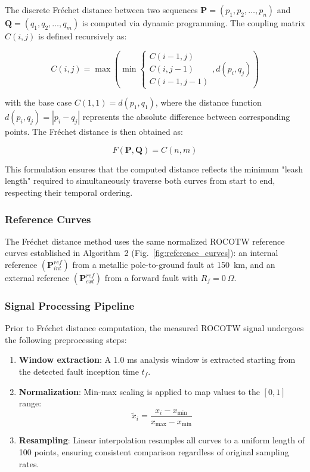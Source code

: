 \documentclass[journal]{IEEEtran}
\begin{document}
The discrete Fréchet distance between two sequences $\mathbf{P} = (p_1, p_2, \ldots, p_n)$ and $\mathbf{Q} = (q_1, q_2, \ldots, q_m)$ is computed via dynamic programming. The coupling matrix $C(i,j)$ is defined recursively as:

\begin{equation}
C(i,j) = \max\left(\min\begin{cases}
C(i-1,j) \\
C(i,j-1) \\
C(i-1,j-1)
\end{cases}, d(p_i, q_j)\right)
\label{eq:frechet_coupling}
\end{equation}

\noindent with the base case $C(1,1) = d(p_1, q_1)$, where the distance function $d(p_i, q_j) = |p_i - q_j|$ represents the absolute difference between corresponding points. The Fréchet distance is then obtained as:

\begin{equation}
F(\mathbf{P}, \mathbf{Q}) = C(n, m)
\label{eq:frechet_final}
\end{equation}

This formulation ensures that the computed distance reflects the minimum "leash length" required to simultaneously traverse both curves from start to end, respecting their temporal ordering.

\subsubsection{Reference Curves}

The Fréchet distance method uses the same normalized ROCOTW reference curves established in Algorithm~2 (Fig.~\ref{fig:reference_curves}): an internal reference $(\mathbf{P}_{int}^{ref})$ from a metallic pole-to-ground fault at 150~km, and an external reference $(\mathbf{P}_{ext}^{ref})$ from a forward fault with $R_f = 0~\Omega$.

\subsubsection{Signal Processing Pipeline}

Prior to Fréchet distance computation, the measured ROCOTW signal undergoes the following preprocessing steps:

\begin{enumerate}
    \item \textbf{Window extraction}: A 1.0 ms analysis window is extracted starting from the detected fault inception time $t_f$.
    \item \textbf{Normalization}: Min-max scaling is applied to map values to the $[0, 1]$ range:
    \begin{equation}
    \tilde{x}_i = \frac{x_i - x_{\min}}{x_{\max} - x_{\min}}
    \label{eq:normalization}
    \end{equation}
    \item \textbf{Resampling}: Linear interpolation resamples all curves to a uniform length of 100 points, ensuring consistent comparison regardless of original sampling rates.
\end{enumerate}
\end{document}
